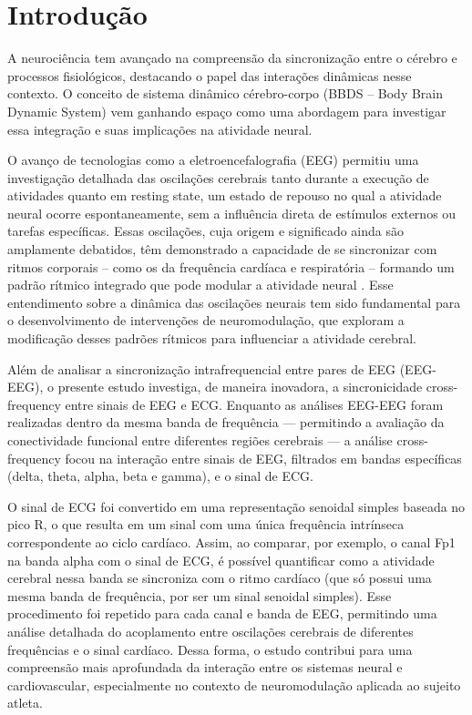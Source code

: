 \chapter{Introdução}
\label{chap:introducao}

A neurociência tem avançado na compreensão da sincronização entre o cérebro e processos fisiológicos, destacando o papel das interações dinâmicas nesse contexto. O conceito de sistema dinâmico cérebro-corpo (BBDS – Body Brain Dynamic System) vem ganhando espaço como uma abordagem para investigar essa integração e suas implicações na atividade neural.

O avanço de tecnologias como a eletroencefalografia (EEG) permitiu uma investigação detalhada das oscilações cerebrais tanto durante a execução de atividades quanto em resting state, um estado de repouso no qual a atividade neural ocorre espontaneamente, sem a influência direta de estímulos externos ou tarefas específicas. Essas oscilações, cuja origem e significado ainda são amplamente debatidos, têm demonstrado a capacidade de se sincronizar com ritmos corporais – como os da frequência cardíaca e respiratória – formando um padrão rítmico integrado que pode modular a atividade neural \cite{criscuolo2022cognition, cohen2017where}. Esse entendimento sobre a dinâmica das oscilações neurais tem sido fundamental para o desenvolvimento de intervenções de neuromodulação, que exploram a modificação desses padrões rítmicos para influenciar a atividade cerebral.

Além de analisar a sincronização intrafrequencial entre pares de EEG (EEG-EEG), o presente estudo investiga, de maneira inovadora, a sincronicidade cross-frequency entre sinais de EEG e ECG. Enquanto as análises EEG-EEG foram realizadas dentro da mesma banda de frequência — permitindo a avaliação da conectividade funcional entre diferentes regiões cerebrais — a análise cross-frequency focou na interação entre sinais de EEG, filtrados em bandas específicas (delta, theta, alpha, beta e gamma), e o sinal de ECG.

O sinal de ECG foi convertido em uma representação senoidal simples baseada no pico R, o que resulta em um sinal com uma única frequência intrínseca correspondente ao ciclo cardíaco. Assim, ao comparar, por exemplo, o canal Fp1 na banda alpha com o sinal de ECG, é possível quantificar como a atividade cerebral nessa banda se sincroniza com o ritmo cardíaco (que só possui uma mesma banda de frequência, por ser um sinal senoidal simples). Esse procedimento foi repetido para cada canal e banda de EEG, permitindo uma análise detalhada do acoplamento entre oscilações cerebrais de diferentes frequências e o sinal cardíaco. Dessa forma, o estudo contribui para uma compreensão mais aprofundada da interação entre os sistemas neural e cardiovascular, especialmente no contexto de neuromodulação aplicada ao sujeito atleta.

